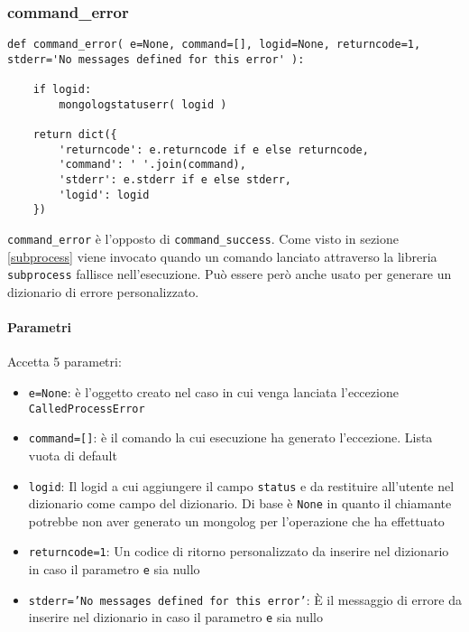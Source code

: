 \documentclass[11pt]{article}
\begin{document}
\subsubsection{command\_error}\label{command\string_error}
\begin{lstlisting}
def command_error( e=None, command=[], logid=None, returncode=1, stderr='No messages defined for this error' ):

    if logid:
        mongologstatuserr( logid )
    
    return dict({
        'returncode': e.returncode if e else returncode,
        'command': ' '.join(command),
        'stderr': e.stderr if e else stderr,
        'logid': logid
    })
\end{lstlisting}
\texttt{command\_error} è l'opposto di \texttt{command\_success}. Come visto in sezione \ref{subprocess} viene invocato quando
un comando lanciato attraverso la libreria \texttt{subprocess} fallisce nell'esecuzione. Può essere però anche usato per
generare un dizionario di errore personalizzato.
\paragraph{Parametri}
Accetta 5 parametri:
\begin{itemize}
	\item{\texttt{e=None}: è l'oggetto creato nel caso in cui venga lanciata l'eccezione \texttt{CalledProcessError}}
	\item{\texttt{command=[]}: è il comando la cui esecuzione ha generato l'eccezione. Lista vuota di default}
	\item{\texttt{logid}: Il logid a cui aggiungere il campo \texttt{status} e da restituire all'utente nel dizionario come campo del dizionario.
		Di base è \texttt{None} in quanto il chiamante potrebbe non aver generato un mongolog per l'operazione che ha effettuato}
	\item{\texttt{returncode=1}: Un codice di ritorno personalizzato da inserire nel dizionario in caso il parametro \texttt{e} sia nullo}
	\item{\texttt{stderr='No messages defined for this error'}: È il messaggio di errore da inserire nel dizionario in caso il parametro \texttt{e}
		sia nullo}
\end{itemize}
\end{document}
